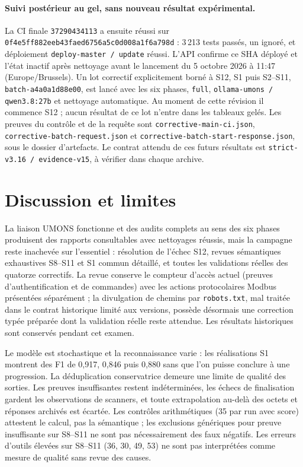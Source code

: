 \documentclass[11pt,a4paper]{article}
\newcommand{\code}[1]{{\urlstyle{tt}\nolinkurl{#1}}}
\begin{document}
\paragraph{Suivi postérieur au gel, sans nouveau résultat expérimental.}
La CI finale \code{37290434113} a ensuite réussi sur \code{0f4e5ff882eeb43faed6756a5c0d008a1f6a798d} : 3\,213 tests passés, un ignoré, et déploiement \code{deploy-master / update} réussi. L'API confirme ce SHA déployé et l'état inactif après nettoyage avant le lancement du 5 octobre 2026 à 11:47 (Europe/Brussels). Un lot correctif explicitement borné à S12, S1 puis S2--S11, \code{batch-a4a0a1d88e00}, est lancé avec les six phases, \code{full}, \code{ollama-umons / qwen3.8:27b} et nettoyage automatique. Au moment de cette révision il commence S12 ; aucun résultat de ce lot n'entre dans les tableaux gelés. Les preuves du contrôle et de la requête sont \code{corrective-main-ci.json}, \code{corrective-batch-request.json} et \code{corrective-batch-start-response.json}, sous le dossier d'artefacts. Le contrat attendu de ces futurs résultats est \code{strict-v3.16 / evidence-v15}, à vérifier dans chaque archive.

\section{Discussion et limites}
\label{sec:discussion}
La liaison UMONS fonctionne et des audits complets au sens des six phases produisent des rapports consultables avec nettoyages r\'eussis, mais la campagne reste inachev\'ee sur l'essentiel : r\'esolution de l'\'echec S12, revues s\'emantiques exhaustives S8--S11 et S1 commun d\'etaill\'e, et toutes les validations r\'eelles des quatorze correctifs. La revue conserve le compteur d'acc\`es actuel (preuves d'authentification et de commandes) avec les actions protocolaires Modbus pr\'esent\'ees s\'epar\'ement ; la divulgation de chemins par \code{robots.txt}, mal traitée dans le contrat historique limité aux versions, possède désormais une correction typée préparée dont la validation réelle reste attendue. Les r\'esultats historiques sont conserv\'es pendant cet examen.

Le mod\`ele est stochastique et la reconnaissance varie : les r\'ealisations S1 montrent des F1 de 0,917, 0,846 puis 0,880 sans que l'on puisse conclure \`a une progression. La d\'eduplication conservatrice demeure une limite de qualit\'e des sorties. Les preuves insuffisantes restent ind\'etermin\'ees, les \'echecs de finalisation gardent les observations de scanners, et toute extrapolation au-del\`a des octets et r\'eponses archiv\'es est \'ecart\'ee. Les contr\^oles arithm\'etiques (35 par run avec score) attestent le calcul, pas la s\'emantique ; les exclusions g\'en\'eriques pour preuve insuffisante sur S8--S11 ne sont pas n\'ecessairement des faux n\'egatifs. Les erreurs d'outils \'elev\'ees sur S8--S11 (36, 30, 49, 53) ne sont pas interpr\'et\'ees comme mesure de qualit\'e sans revue des causes.
\end{document}
